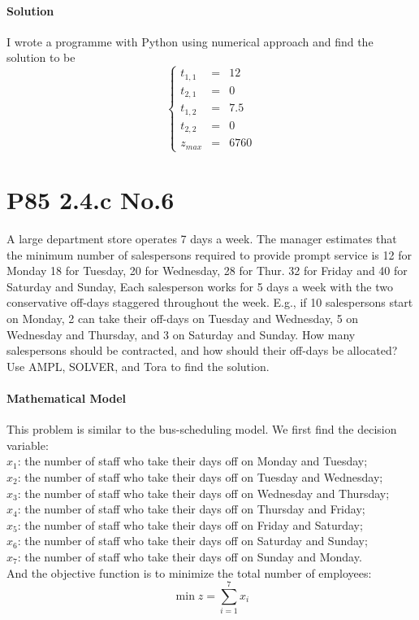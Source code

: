 \documentclass{article}
\numberwithin{equation}{section}
\begin{document}
\paragraph{Solution}
I wrote a programme with Python using numerical approach and find the solution to be
\begin{equation}
	\left\{
	\begin{array}{rcl}
	t_{1,1}&=& 12\\
	t_{2,1}&=& 0\\
	t_{1,2}&=& 7.5\\
	t_{2,2}&=& 0\\
	z_{max}&=& 6760
	\end{array}\right.	
\end{equation}



\section{P85 2.4.c No.6}
A large department store operates 7 days a week. The manager estimates that the minimum number of salespersons required to provide prompt service is 12 for Monday 18 for Tuesday, 20 for Wednesday, 28 for Thur. 32 for Friday and 40 for Saturday and Sunday, Each salesperson works for 5 days a week with the two conservative off-days staggered throughout the week. E.g., if 10 salespersons start on Monday, 2 can take their off-days on Tuesday and Wednesday, 5 on Wednesday and Thursday, and 3 on Saturday and Sunday. How many salespersons should be contracted, and how should their off-days be allocated? Use AMPL, SOLVER, and Tora to find the solution. 

\paragraph{Mathematical Model}
This problem is similar to the bus-scheduling model. We first find the decision variable:\\
\indent $x_1$: the number of staff who take their days off on Monday and Tuesday;\\ 
\indent $x_2$: the number of staff who take their days off on Tuesday and Wednesday;\\
\indent $x_3$: the number of staff who take their days off on Wednesday and Thursday;\\
\indent $x_4$: the number of staff who take their days off on Thursday and Friday;\\
\indent $x_5$: the number of staff who take their days off on Friday and Saturday;\\
\indent $x_6$: the number of staff who take their days off on Saturday and Sunday;\\
\indent $x_7$: the number of staff who take their days off on Sunday and Monday.\\
And the objective function is to minimize the total number of employees:
\begin{equation}
	\min z=\sum_{i=1}^{7}x_i
\end{equation}
\end{document}
